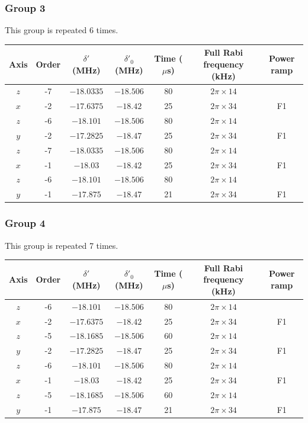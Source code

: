 \documentclass[aps,secnumarabic,amsmath,amssymb]{revtex4}
\begin{document}
\subsubsection{Group 3}
This group is repeated 6 times.
\begin{center}
  \begin{tabular}{|c|c|c|c|c|c|c|}
    \hline
    Axis&Order&$\delta'$ (MHz)&$\delta'_0$ (MHz)&Time ($\mu$s)&Full Rabi frequency (kHz)&Power ramp\\\hline
    $z$&-7&$-18.0335$&$-18.506$&80&$2\pi\times14$&\\\hline
    $x$&-2&$-17.6375$&$-18.42$&25&$2\pi\times34$&F1\\\hline
    $z$&-6&$-18.101$&$-18.506$&80&$2\pi\times14$&\\\hline
    $y$&-2&$-17.2825$&$-18.47$&25&$2\pi\times34$&F1\\\hline
    $z$&-7&$-18.0335$&$-18.506$&80&$2\pi\times14$&\\\hline
    $x$&-1&$-18.03$&$-18.42$&25&$2\pi\times34$&F1\\\hline
    $z$&-6&$-18.101$&$-18.506$&80&$2\pi\times14$&\\\hline
    $y$&-1&$-17.875$&$-18.47$&21&$2\pi\times34$&F1\\\hline
  \end{tabular}
\end{center}
\subsubsection{Group 4}
This group is repeated 7 times.
\begin{center}
  \begin{tabular}{|c|c|c|c|c|c|c|}
    \hline
    Axis&Order&$\delta'$ (MHz)&$\delta'_0$ (MHz)&Time ($\mu$s)&Full Rabi frequency (kHz)&Power ramp\\\hline
    $z$&-6&$-18.101$&$-18.506$&80&$2\pi\times14$&\\\hline
    $x$&-2&$-17.6375$&$-18.42$&25&$2\pi\times34$&F1\\\hline
    $z$&-5&$-18.1685$&$-18.506$&60&$2\pi\times14$&\\\hline
    $y$&-2&$-17.2825$&$-18.47$&25&$2\pi\times34$&F1\\\hline
    $z$&-6&$-18.101$&$-18.506$&80&$2\pi\times14$&\\\hline
    $x$&-1&$-18.03$&$-18.42$&25&$2\pi\times34$&F1\\\hline
    $z$&-5&$-18.1685$&$-18.506$&60&$2\pi\times14$&\\\hline
    $y$&-1&$-17.875$&$-18.47$&21&$2\pi\times34$&F1\\\hline
  \end{tabular}
\end{center}
\end{document}
